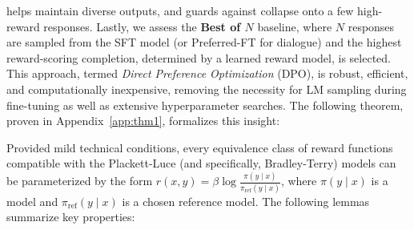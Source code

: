 \begin{lemma}
helps maintain diverse outputs, and guards against collapse onto a few high-reward responses. Lastly, we assess the \textbf{Best of $N$} baseline, where $N$ responses are sampled from the SFT model (or Preferred-FT for dialogue) and the highest reward-scoring completion, determined by a learned reward model, is selected. This approach, termed \textit{Direct Preference Optimization} (DPO), is robust, efficient, and computationally inexpensive, removing the necessity for LM sampling during fine-tuning as well as extensive hyperparameter searches. The following theorem, proven in Appendix~\ref{app:thm1}, formalizes this insight:

\begin{theorem}\label{thm:main}
    Provided mild technical conditions, every equivalence class of reward functions compatible with the Plackett-Luce (and specifically, Bradley-Terry) models can be parameterized by the form ${r(x, y) = \beta \log \frac{\pi(y\mid x)}{\pi_\text{ref}(y\mid x)}}$, where $\pi(y\mid x)$ is a model and $\pi_\text{ref}(y \mid x)$ is a chosen reference model. The following lemmas summarize key properties:


\end{theorem}
\end{lemma}
